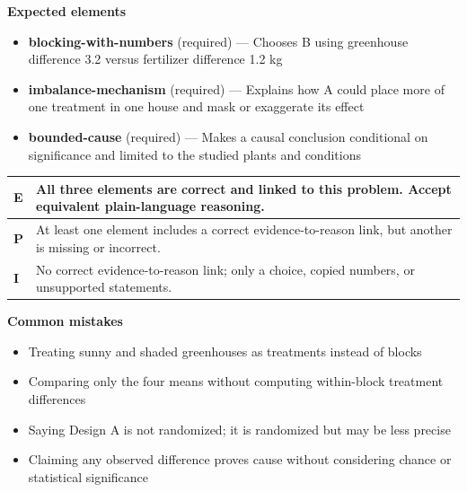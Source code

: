 \documentclass[11pt]{article}
\begin{document}

\textbf{Expected elements}
\begin{itemize}[leftmargin=1.5em,itemsep=2pt,topsep=2pt]
  \item \textbf{blocking-with-numbers} (required) --- Chooses B using greenhouse difference 3.2 versus fertilizer difference 1.2 kg
  \item \textbf{imbalance-mechanism} (required) --- Explains how A could place more of one treatment in one house and mask or exaggerate its effect
  \item \textbf{bounded-cause} (required) --- Makes a causal conclusion conditional on significance and limited to the studied plants and conditions
\end{itemize}

{\small\renewcommand{\arraystretch}{1.25}
\noindent\begin{tabular}{|p{0.5in}|p{5.9in}|}
\hline
\textbf{E} & All three elements are correct and linked to this problem. Accept equivalent plain-language reasoning. \\ \hline
\textbf{P} & At least one element includes a correct evidence-to-reason link, but another is missing or incorrect. \\ \hline
\textbf{I} & No correct evidence-to-reason link; only a choice, copied numbers, or unsupported statements. \\ \hline
\end{tabular}}

\textbf{Common mistakes}
\begin{itemize}[leftmargin=1.5em,itemsep=2pt,topsep=2pt]
  \item Treating sunny and shaded greenhouses as treatments instead of blocks
  \item Comparing only the four means without computing within-block treatment differences
  \item Saying Design A is not randomized; it is randomized but may be less precise
  \item Claiming any observed difference proves cause without considering chance or statistical significance
\end{itemize}

\clearpage
{}
\end{document}
